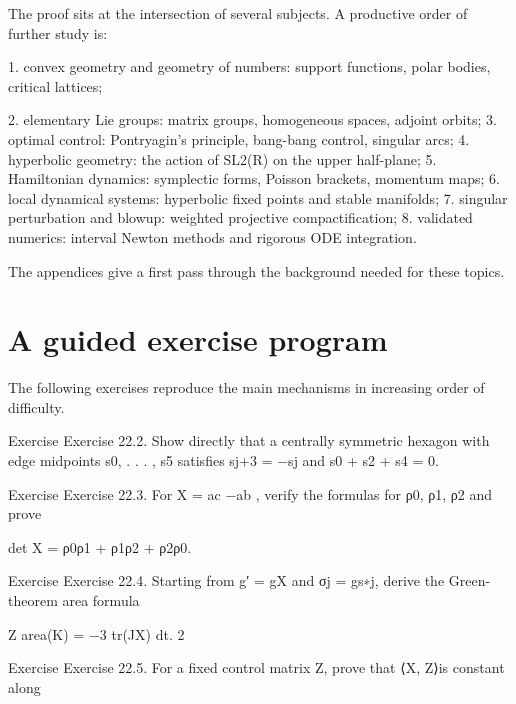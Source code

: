 The proof sits at the intersection of several subjects. A productive order of further study is:


1. convex geometry and geometry of numbers: support functions, polar bodies, critical lattices;


2. elementary Lie groups: matrix groups, homogeneous spaces, adjoint orbits; 3. optimal control: Pontryagin’s principle, bang-bang control, singular arcs; 4. hyperbolic geometry: the action of SL2(R) on the upper half-plane; 5. Hamiltonian dynamics: symplectic forms, Poisson brackets, momentum maps; 6. local dynamical systems: hyperbolic fixed points and stable manifolds; 7. singular perturbation and blowup: weighted projective compactification; 8. validated numerics: interval Newton methods and rigorous ODE integration.


The appendices give a first pass through the background needed for these topics.


\section{A guided exercise program}

The following exercises reproduce the main mechanisms in increasing order of difficulty.


\begin{statementbox}{Exercise}
Exercise 22.2. Show directly that a centrally symmetric hexagon with edge midpoints s0, . . . , s5 satisfies sj+3 = −sj and s0 + s2 + s4 = 0.
\end{statementbox}

\begin{statementbox}{Exercise}
Exercise 22.3. For X = ac −ab , verify the formulas for ρ0, ρ1, ρ2 and prove
\end{statementbox}

\begin{displaytext}
det X = ρ0ρ1 + ρ1ρ2 + ρ2ρ0.
\end{displaytext}

\begin{statementbox}{Exercise}
Exercise 22.4. Starting from g′ = gX and σj = gs∗j, derive the Green-theorem area formula
\end{statementbox}

Z area(K) = −3 tr(JX) dt. 2


\begin{statementbox}{Exercise}
Exercise 22.5. For a fixed control matrix Z, prove that ⟨X, Z⟩is constant along
\end{statementbox}

